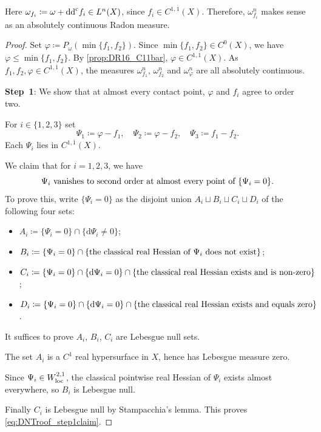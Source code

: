 Here $\omega_{f_i}\coloneqq \omega+\mathrm{dd}^{\mathrm{c}} f_i\in L^n(X)$, since $f_i\in C^{1,\overline{1}}(X)$. Therefore, $\omega_{f_i}^n$ makes sense as an absolutely continuous Radon measure.

\begin{proof}
Set $\varphi\coloneqq P_\omega(\min\{f_1,f_2\})$. Since $\min\{f_1,f_2\}\in C^0(X)$, we have $\varphi\leq \min\{f_1,f_2\}$. By \cref{prop:DR16_C11bar}, $\varphi\in C^{1,\overline{1}}(X)$. As $f_1,f_2,\varphi\in C^{1,\overline{1}}(X)$, the measures $\omega^n_{f_1}$, $\omega^n_{f_2}$ and $\omega^n_\varphi$ are all absolutely continuous.

\textbf{Step~1}: We show that at almost every contact point, $\varphi$ and $f_i$ agree to order two.

For $i\in\{1,2,3\}$ set
\[
\Psi_1\coloneqq \varphi-f_1,\quad \Psi_2\coloneqq \varphi-f_2,\quad \Psi_3\coloneqq f_1-f_2.
\]
Each $\Psi_i$ lies in $C^{1,\overline{1}}(X)$.

We claim that for $i=1,2,3$, we have
\begin{equation}\label{eq:DNTroof_step1claim}
\Psi_i\textup{ vanishes to second order at almost every point of }\{\Psi_i=0\}.
\end{equation}
To prove this, write $\{\Psi_i=0\}$ as the disjoint union $A_i\sqcup B_i\sqcup C_i\sqcup D_i$ of the following four sets:
\begin{itemize}
\item $A_i\coloneqq \{\Psi_i=0\}\cap\{\mathrm{d}\Psi_i\neq 0\}$;
\item $B_i\coloneqq \{\Psi_i=0\}\cap \{\textup{the classical real Hessian of }\Psi_i\textup{ does not exist}\}$;
\item $C_i\coloneqq \{\Psi_i=0\}\cap\{\mathrm{d}\Psi_i=0\}\cap\{\textup{the classical real Hessian exists and is non-zero}\}$;
\item $D_i\coloneqq \{\Psi_i=0\}\cap\{\mathrm{d}\Psi_i=0\}\cap\{\textup{the classical real Hessian exists and equals zero}\}$.
\end{itemize}
It suffices to prove $A_i$, $B_i$, $C_i$ are Lebesgue null sets.

The set $A_i$ is a $C^1$ real hypersurface in $X$, hence has Lebesgue measure zero.

Since $\Psi_i\in W^{2,1}_{\mathrm{loc}}$, the classical pointwise real Hessian of $\Psi_i$ exists almost everywhere, so $B_i$ is Lebesgue null.

Finally $C_i$ is Lebesgue null by Stampacchia's lemma. This proves \eqref{eq:DNTroof_step1claim}.


\end{proof}
